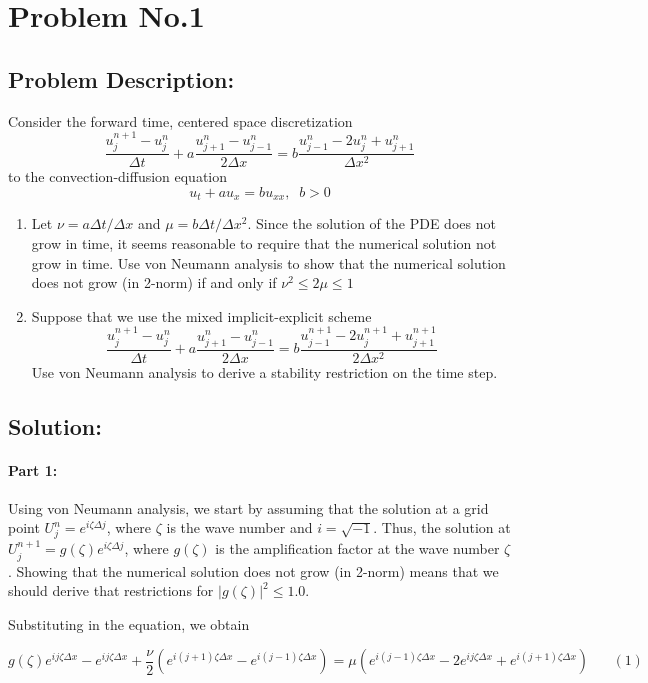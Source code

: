 \section{Problem No.1}
\subsection{Problem Description:} 
Consider the forward time, centered space discretization 
$$
\frac{u_{j}^{n+1} -u_{j}^{n}}{\Delta t} + a\frac{u_{j+1}^{n} -u_{j-1}^{n}}{2\Delta x}=b\frac{u_{j-1}^{n} -2u_{j}^{n} +u_{j+1}^{n} }{\Delta x^{2}}
$$
to the convection-diffusion equation 
$$
u_{t} + au_{x} = bu_{xx}, \;\; b>0
$$
\begin{enumerate}
\item Let $\nu=a\Delta t/\Delta x $ and $\mu = b\Delta t/\Delta x^{2}$. Since the solution of the PDE does not grow in time, it seems reasonable to require that the numerical solution not grow in time. Use von Neumann analysis to show that the numerical solution does not grow (in 2-norm) if and only if $\nu^{2}\leq 2 \mu \leq 1$
\item Suppose that we use the mixed implicit-explicit scheme 
$$
\frac{u_{j}^{n+1}-u_{j}^{n}}{\Delta t} + a\frac{u_{j+1}^{n}-u_{j-1}^{n}}{2\Delta x} = b\frac{u_{j-1}^{n+1}-2u_{j}^{n+1}+u_{j+1}^{n+1} }{2\Delta x^{2}}
$$
Use von Neumann analysis to derive a stability restriction on the time step.
\end{enumerate}

\subsection{Solution:} 
\paragraph{Part 1:} Using von Neumann analysis, we start by assuming that the solution at a grid point $U_{j}^{n} = e^{i\zeta \Delta j}$, where $\zeta$ is the wave number and $i=\sqrt{-1}$. Thus, the solution at $U_{j}^{n+1} = g(\zeta) e^{i\zeta \Delta j}$, where $g(\zeta)$ is the amplification factor at the wave number $\zeta$. Showing that the numerical solution does not grow (in 2-norm) means that we should derive that restrictions for $|g(\zeta)|^{2}\leq 1.0$.

Substituting in the equation, we obtain

$$
g(\zeta)e^{ij\zeta\Delta x} - e^{ij\zeta\Delta x} + \frac{\nu}{2}(e^{i(j+1)\zeta\Delta x} -e^{i(j-1)\zeta\Delta x}) = \mu (e^{i(j-1)\zeta\Delta x} -2e^{ij\zeta\Delta x}+e^{i(j+1)\zeta\Delta x}) \;\;\;\;\;\;    (1)
$$

